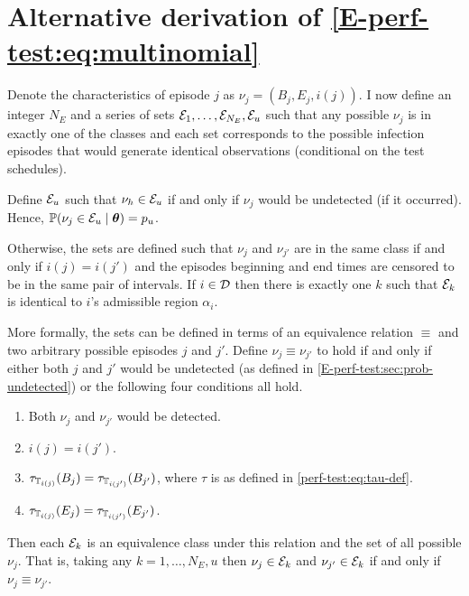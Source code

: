 \documentclass[thesis.tex]{subfiles}
\begin{document}
\chapter{Alternative derivation of \cref{E-perf-test:eq:multinomial}} \label{perf-test:sec:alt-likelihood}

Denote the characteristics of episode $j$ as $\nu_j = (B_j, E_j, i(j))$.
I now define an integer $N_E$ and a series of sets $\mathcal{E}_1, \dots, \mathcal{E}_{N_E}, \mathcal{E}_u$ such that any possible $\nu_j$ is in exactly one of the classes and each set corresponds to the possible infection episodes that would generate identical observations (conditional on the test schedules).

Define $\mathcal{E}_u$ such that $\nu_h \in \mathcal{E}_u$ if and only if $\nu_j$ would be undetected (if it occurred).
Hence, $\operatorname{\mathbb{P}}(\nu_j \in \mathcal{E}_u \mid \bm{\theta}) = p_u$.

Otherwise, the sets are defined such that $\nu_j$ and $\nu_{j'}$ are in the same class if and only if $i(j) = i(j')$ and the episodes beginning and end times are censored to be in the same pair of intervals.
If $i \in \mathcal{D}$ then there is exactly one $k$ such that $\mathcal{E}_k$ is identical to $i$'s admissible region $\alpha_i$.

More formally, the sets can be defined in terms of an equivalence relation $\equiv$ and two arbitrary possible episodes $j$ and $j'$.
Define $\nu_j \equiv \nu_{j'}$ to hold if and only if either both $j$ and $j'$ would be undetected (as defined in \cref{E-perf-test:sec:prob-undetected}) or the following four conditions all hold.
\begin{enumerate}
    \item Both $\nu_j$ and $\nu_{j'}$ would be detected.
    \item $i(j) = i(j')$.
    \item $\tau_{\mathbb{T}_{i(j)}}(B_j) = \tau_{\mathbb{T}_{i(j')}}(B_{j'})$, where $\tau$ is as defined in \cref{perf-test:eq:tau-def}.
    \item $\tau_{\mathbb{T}_{i(j)}}(E_j) = \tau_{\mathbb{T}_{i(j')}}(E_{j'})$.
\end{enumerate}
Then each $\mathcal{E}_k$ is an equivalence class under this relation and the set of all possible $\nu_j$.
That is, taking any $k = 1, \dots, N_E, u$ then $\nu_j \in \mathcal{E}_k$ and $\nu_{j'} \in \mathcal{E}_k$ if and only if $\nu_j \equiv \nu_{j'}$.
\end{document}
